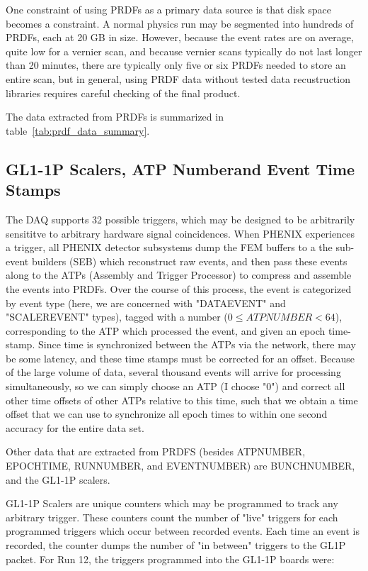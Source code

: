 One constraint of using PRDFs as a primary data source is that disk space becomes a
constraint. A normal physics run may be segmented into hundreds of PRDFs, each at 20 GB in
size. However, because the event rates are on average, quite low for a vernier scan, and
because vernier scans typically do not last longer than 20 minutes, there are typically
only five or six PRDFs needed to store an entire scan, but in general, using PRDF data
without tested data recustruction libraries requires careful checking of the final
product.

The data extracted from PRDFs is summarized in table~\ref{tab:prdf_data_summary}.


\subsection{GL1-1P Scalers, ATP Numberand Event Time Stamps}
The DAQ supports 32 possible triggers, which may be designed to be arbitrarily sensititve
to arbitrary hardware signal coincidences. When PHENIX experiences a trigger, all PHENIX
detector subsystems dump the FEM buffers to a the sub-event builders (SEB) which
reconstruct raw events, and then pass these events along to the ATPs (Assembly and Trigger
Processor) to compress and assemble the events into PRDFs. Over the course of this
process, the event is categorized by event type (here, we are concerned with "DATAEVENT"
and "SCALEREVENT" types), tagged with a number ($0 \leq ATPNUMBER < 64$),
corresponding to the ATP which processed the event, and given an epoch time-stamp. Since
time is synchronized between the ATPs via the network, there may be some latency, and
these time stamps must be corrected for an offset.  Because of the large volume of data,
several thousand events will arrive for processing simultaneously, so we can simply choose
an ATP (I choose "0") and correct all other time offsets of other ATPs relative to this
time, such that we obtain a time offset that we can use to synchronize all epoch times to
within one second accuracy for the entire data set.

Other data that are extracted from PRDFS (besides ATPNUMBER, EPOCHTIME, RUNNUMBER,
and EVENTNUMBER) are BUNCHNUMBER, and the GL1-1P scalers.

GL1-1P Scalers are unique counters which may be programmed to track any arbitrary
trigger. These counters count the number of "live" triggers for each programmed triggers
which occur between recorded events. Each time an event is recorded, the counter dumps the
number of "in between" triggers to the GL1P packet. For Run 12, the triggers programmed
into the GL1-1P boards were:

